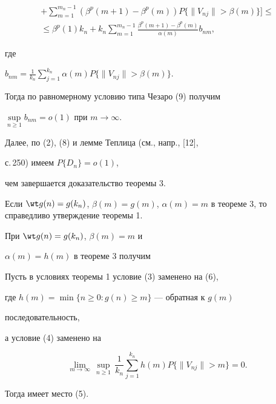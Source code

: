 \begin{pf}
\begin{gather*}
%


+\sum^{m_{n}-1}_{m=1}(\beta^p(m+1)- \beta^p(m))


P\{\|V_{nj}\|>\beta(m)\}]\le \\


%


\leq \beta^p(1)k_n +k_n


\sum^{m_n-1}_{m=1}\frac{\beta^p(m+1)-\beta^p(m)}{\alpha(m)}b_{nm},


\end{gather*}


где


$b_{nm}=\frac{1}{k_n}\sum\limits_{j=1}^{k_n}


\alpha(m) P\{\|V_{nj}\|> \beta(m)\}$.


Тогда по равномерному условию типа Чезаро (9) получим


$\sup\limits_{n\ge 1}


b_{nm}= o(1)$ при $m\to\infty$.


Далее, по (2), (8) и лемме Теплица (см., напр., [12],


с.\,250) имеем $P\{D_n\}=o(1)$,


чем завершается доказательство теоремы 3.


\end{pf}





\begin{cor}


Если $\wt g(n)= g(k_n)$, $\beta(m)= g(m)$, $\alpha(m)=


m$ в теореме 3, то справедливо утверждение теоремы 1.


\end{cor}





При $\wt g(n)= g(k_n)$, $\beta(m)= m$ и


$\alpha(m)= h(m)$ в теореме 3 получим





\begin{cor}


Пусть в условиях теоремы 1 условие (3) заменено на (6),


где $h(m)=\min\{n\ge 0: g(n)\ge m\}$ --- обратная к $g(m)$


последовательность,


а условие (4) заменено на


\begin{equation}


\lim_{m \rightarrow \infty}\, \sup_{n \geq 1}\, \frac{1}{k_n}


\sum^{k_n}_{j=1} h(m) P\{\|V_{nj}\|> m\} = 0.


\end{equation}


Тогда имеет место (5).


\end{cor}








